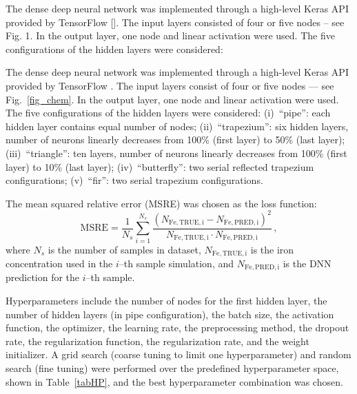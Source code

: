 \documentclass[num-refs]{wiley-article} %
\begin{document}
The dense deep neural network was implemented through a high-level Keras API provided by TensorFlow [].
The input layers consisted of four or five nodes -- see Fig. 1.
In the output layer, one node and linear activation were used.
The five configurations of the hidden layers  were considered:

The dense deep neural network was implemented through a high-level Keras API provided by TensorFlow \cite{Keras}.
The input layers consist of four or five nodes --- see Fig.~\ref{fig_chem}.
In the output layer, one node and linear activation were used.
The five configurations of the hidden layers  were considered:
(i)~``pipe'': each hidden layer contains equal number of nodes;
(ii)~``trapezium'': six hidden layers, number of neurons linearly decreases from 100\% (first layer) to 50\% (last layer);
(iii)~``triangle'': ten layers, number of neurons linearly decreases from 100\% (first layer) to 10\% (last layer);
(iv)~``butterfly'': two serial reflected trapezium configurations;
(v)~``fir'': two serial trapezium configurations.


The mean squared relative error (MSRE) was chosen as the loss function:
\begin{equation}
\label{eqMSRE}
    \mathrm{MSRE}=\frac{1}{N_s}\sum_{i=1}^{N_s}\frac{(N_\mathrm{Fe,TRUE,i}-N_\mathrm{Fe,PRED,i})^2}{N_\mathrm{Fe,TRUE,i}\cdot N_\mathrm{Fe,PRED,i}}\,,
\end{equation}
where
$N_s$ is the number of samples in dataset,
$N_\mathrm{Fe,TRUE,i}$ is the iron concentration used in the $i$--th sample simulation, and
$N_\mathrm{Fe,PRED,i}$ is the DNN prediction for the $i$--th sample.

Hyperparameters include the number of nodes for the first hidden layer,
the number of hidden layers (in pipe configuration),
the batch size,
the activation function,
the optimizer,
the learning rate,
the preprocessing method,
the dropout rate,
the regularization function,
the regularization rate,
and the weight initializer.
A grid search (coarse tuning to limit one hyperparameter) and random search (fine tuning) were performed over the predefined hyperparameter space,
shown in Table~\ref{tabHP}, and the best hyperparameter combination was chosen.
\end{document}
